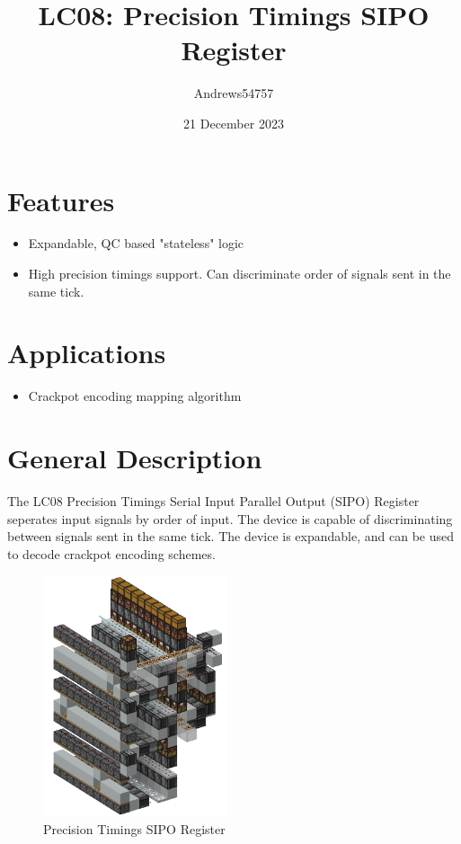 \documentclass[10pt]{datasheet}
\title{LC08: Precision Timings SIPO Register}
\author{Andrews54757}
\date{21 December 2023}
\begin{document}
\maketitle

\section{Features}

\begin{itemize}
\item{Expandable, QC based "stateless" logic}
\item{High precision timings support. Can discriminate order of signals sent in the same tick.}
\end{itemize}

\section{Applications}

\begin{itemize}
\item{Crackpot encoding mapping algorithm}
\end{itemize}

\section{General Description}
The LC08 Precision Timings Serial Input Parallel Output (SIPO) Register seperates input signals by order of input. The device is capable of discriminating between signals sent in the same tick. The device is expandable, and can be used to decode crackpot encoding schemes.

\vfill\break

\begin{figure}[h]
    \centering
    \includegraphics[width=0.48\textwidth]{sipo.png}
    \caption{\centering Precision Timings SIPO Register}
\end{figure}
\end{document}
